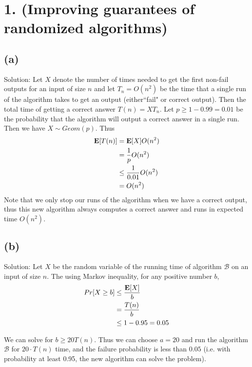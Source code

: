 \documentclass[11pt]{537homework}
\author{Peilun Dai}
\begin{document}
\section*{1. (Improving guarantees of randomized algorithms) }



\subsection*{(a)}

Solution: Let $X$ denote the number of times needed to get the first non-fail outputs for an input of size $n$ and let $T_n = O(n^2)$ be the time that a single run of the algorithm takes to get an output (either``fail" or correct output). Then the total time of getting a correct answer $T(n) = XT_n$. Let $p \geq 1-0.99 = 0.01$ be the probability that the algorithm will output a correct answer in a single run. Then we have $X \sim Geom(p)$. Thus
\begin{align}
  \mathbf{E}[T(n)]  & = \mathbf{E}[X]O(n^2) \\
                    & = {1 \over p} O(n^2) \\
                    & \leq {1 \over 0.01} O(n^2) \\
                    & = O(n^2)
\end{align}
Note that we only stop our runs of the algorithm when we have a correct output, thus this new algorithm always computes a correct answer and runs in expected time $O(n^2)$.


\subsection*{(b)} 

Solution: Let $X$ be the random variable of the running time of algorithm $\mathcal{B}$ on an input of size $n$. The using Markov inequality, for any positive number $b$,
\begin{align}
  Pr[X\geq b] & \leq {\mathbf{E}[X] \over b} \\
              & = {T(n) \over b} \\
              & \leq 1 - 0.95 = 0.05 
\end{align}

We can solve for $b \geq 20T(n)$. Thus we can choose $a = 20$ and run the algorithm $\mathcal{B}$ for $ 20\cdot T(n)$ time, and the failure probability is less than $0.05$ (i.e. with probability at least 0.95, the new algorithm can solve the problem). 
\end{document}
